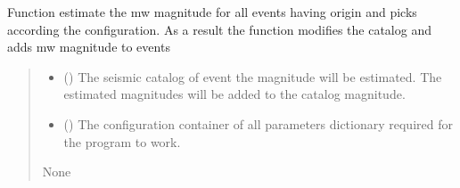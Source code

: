 \documentclass[letterpaper,10pt,english]{sphinxmanual}
\begin{document}
\begin{fulllineitems}
\label{\detokenize{api_main:amw.mw.spectral_mw.catalog_moment_magnitudes}}
\pysigstartsignatures
{}
\pysigstopsignatures
\sphinxAtStartPar
Function estimate the mw magnitude for all events having origin and picks according the configuration.
As a result the function modifies the catalog and adds mw magnitude to events
\begin{quote}\begin{description}
\begin{itemize}
\item {} 
\sphinxAtStartPar
{} () \textendash{} The seismic catalog of event the magnitude will be estimated.
The estimated magnitudes will be added to the catalog magnitude.

\item {} 
\sphinxAtStartPar
{} () \textendash{} The configuration container of all parameters dictionary required for the program to work.

\end{itemize}

\sphinxAtStartPar
None

\end{description}\end{quote}

\end{fulllineitems}

\end{document}
